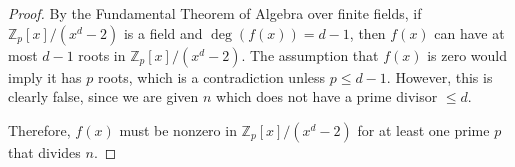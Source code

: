 \documentclass{article}
\theoremstyle{plain}
\theoremstyle{definition}
\begin{document}
\begin{proof}
By the Fundamental Theorem of Algebra over finite fields, if $\mathbb{Z}_p[x]/(x^d - 2)$ is a field and $\deg(f(x)) = d-1$, then $f(x)$ can have at most $d-1$ roots in $\mathbb{Z}_p[x]/(x^d - 2)$. The assumption that $f(x)$ is zero would imply it has $p$ roots, which is a contradiction unless $p \leq d-1$. However, this is clearly false, since we are given $n$ which does not have a prime divisor $\leq d$.

Therefore, $f(x)$ must be nonzero in $\mathbb{Z}_p[x]/(x^d - 2)$ for at least one prime $p$ that divides $n$.
\end{proof}
\end{document}
